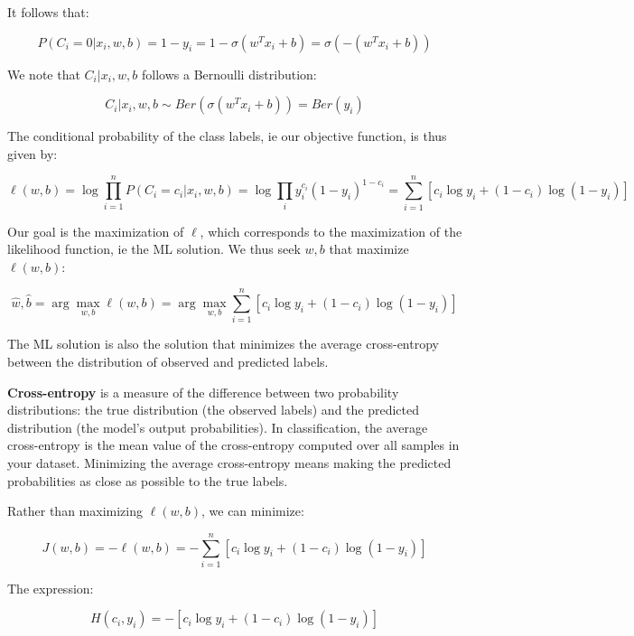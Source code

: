It follows that:


\begin{equation*}
P(C_i = 0 | x_i, w, b) = 1 - y_i = 1 - \sigma(w^T x_i + b) = \sigma(-(w^T x_i + b))
\end{equation*}

We note that $C_i | x_i, w, b$ follows a Bernoulli distribution:


\begin{equation*}
C_i | x_i, w, b \sim Ber(\sigma(w^T x_i + b)) = Ber(y_i)
\end{equation*}

The conditional probability of the class labels, ie our objective function, is thus given by:


\begin{equation*}
\ell(w, b) = \log \prod_{i=1}^n P(C_i = c_i | x_i, w, b) = \log \prod_i y_i^{c_i} (1-y_i)^{1-c_i} = \sum_{i=1}^n [c_i \log y_i + (1-c_i) \log (1-y_i)]
\end{equation*}

Our goal is the maximization of $\ell$, which corresponds to the maximization of the likelihood function, ie the ML solution. We thus seek $w, b$ that maximize $\ell(w, b)$:


\begin{equation*}
\hat{w}, \hat{b} = \arg\max_{w, b} \ell(w, b) = \arg\max_{w, b} \sum_{i=1}^n [c_i \log y_i + (1-c_i) \log (1-y_i)]
\end{equation*}

The ML solution is also the solution that minimizes the average cross-entropy between the distribution of observed and predicted labels.

\textbf{Cross-entropy} is a measure of the difference between two probability distributions: the true distribution (the observed labels) and the predicted distribution (the model's output probabilities). In classification, the average cross-entropy is the mean value of the cross-entropy computed over all samples in your dataset. Minimizing the average cross-entropy means making the predicted probabilities as close as possible to the true labels.

Rather than maximizing $\ell(w, b)$, we can minimize:


\begin{equation*}
J(w, b) = -\ell(w, b) = -\sum_{i=1}^n [c_i \log y_i + (1-c_i) \log (1-y_i)]
\end{equation*}

The expression:


\begin{equation*}
H(c_i, y_i) = -[c_i \log y_i + (1-c_i) \log (1-y_i)]
\end{equation*}

